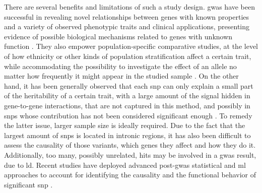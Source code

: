 There are several benefits and limitations of such a study design. \ac{gwas} have been successful in revealing novel relationships between genes with known properties and a variety of observed phenotypic traits and clinical applications, presenting evidence of possible biological mechanisms related to genes with unknown function \cite{Tam2019}. They also empower population-specific comparative studies, at the level of how ethnicity or other kinds of population stratification affect a certain trait, while accommodating the possibility to investigate the effect of an allele no matter how frequently it might appear in the studied sample \cite{Tam2019}. 
On the other hand, it has been generally observed  that each \ac{snp} can only explain a small part of the heritability of a certain trait, with a large amount of the signal hidden in gene-to-gene interactions, that are not captured in this method, and possibly in \acp{snp} whose contribution has not been considered significant enough  \cite{Tam2019}. To remedy the latter issue, larger sample size is ideally required. Due to the fact that the largest amount of \acp{snp} is located in intronic regions, it has also been difficult to assess the causality of those variants, which genes they affect and how they do it. Additionally, too many, possibly unrelated, hits may be involved in a \ac{gwas} result, due to \ac{ld}. \cite{Tam2019} Recent studies have deployed advanced post-\ac{gwas} statistical and \ac{ml} approaches to account for identifying the causality and the functional behavior of significant \ac{snp}  \cite{Nicholls2020,Gallagher2018}. 


